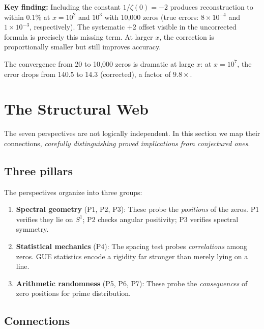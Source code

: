 \documentclass[11pt,a4paper]{article}
\theoremstyle{definition}
\begin{document}
\noindent\textbf{Key finding:} Including the constant $1/\zeta(0) = -2$ produces reconstruction to within $0.1\%$ at $x = 10^2$ and $10^3$ with 10{,}000 zeros (true errors: $8 \times 10^{-4}$ and $1 \times 10^{-3}$, respectively). The systematic $+2$ offset visible in the uncorrected formula is precisely this missing term. At larger $x$, the correction is proportionally smaller but still improves accuracy.

The convergence from 20 to 10{,}000 zeros is dramatic at large $x$: at $x = 10^7$, the error drops from 140.5 to 14.3 (corrected), a factor of $9.8\times$.

\section{The Structural Web}
\label{sec:web}

The seven perspectives are not logically independent. In this section we map their connections, \emph{carefully distinguishing proved implications from conjectured ones}.

\subsection{Three pillars}

The perspectives organize into three groups:
\begin{enumerate}[label=(\Alph*)]
  \item \textbf{Spectral geometry} (P1, P2, P3): These probe the \emph{positions} of the zeros. P1 verifies they lie on $S^1$; P2 checks angular positivity; P3 verifies spectral symmetry.
  
  \item \textbf{Statistical mechanics} (P4): The spacing test probes \emph{correlations} among zeros. GUE statistics encode a rigidity far stronger than merely lying on a line.
  
  \item \textbf{Arithmetic randomness} (P5, P6, P7): These probe the \emph{consequences} of zero positions for prime distribution.
\end{enumerate}

\subsection{Connections}
\end{document}
